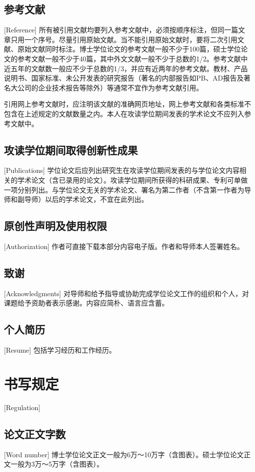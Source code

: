 \subsection{参考文献}[Reference]
所有被引用文献均要列入参考文献中，必须按顺序标注，但同一篇文章只用一个序号。尽量引用原始文献。当不能引用原始文献时，要将二次引用文献、原始文献同时标注。博士学位论文的参考文献一般不少于100篇，硕士学位论文的参考文献一般不少于40篇，其中外文文献一般不少于总数的1/2。参考文献中近五年的文献数一般应不少于总数的1/3，并应有近两年的参考文献。教材、产品说明书、国家标准、未公开发表的研究报告（著名的内部报告如PB、AD报告及著名大公司的企业技术报告等除外）等通常不宜作为参考文献引用。

引用网上参考文献时，应注明该文献的准确网页地址，网上参考文献和各类标准不包含在上述规定的文献数量之内。本人在攻读学位期间发表的学术论文不应列入参考文献中。

\subsection{攻读学位期间取得创新性成果}[Publications]
学位论文后应列出研究生在攻读学位期间发表的与学位论文内容相关的学术论文（含已录用的论文）。攻读学位期间所获得的科研成果、专利可单做一项分别列出。与学位论文无关的学术论文、署名为第二作者（不含第一作者为导师和副导师）以后的学术论文，不宜在此列出。

\subsection{原创性声明及使用权限}[Authorization]
作者可直接下载本部分内容电子版。作者和导师本人签署姓名。

\subsection{致谢}[Acknowledgments]
对导师和给予指导或协助完成学位论文工作的组织和个人，对课题给予资助者表示感谢。内容应简朴、语言应含蓄。

\subsection{个人简历}[Resume]
包括学习经历和工作经历。

\section{书写规定}[Regulation]
\subsection{论文正文字数}[Word number]
博士学位论文正文一般为6万～10万字（含图表）。硕士学位论文正文一般为3万～5万字（含图表）。

